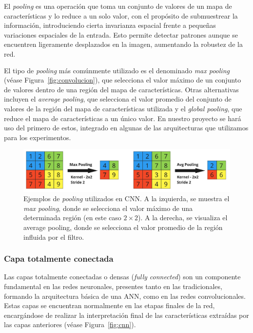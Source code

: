El \textit{pooling} es una operación que toma un conjunto de valores de un mapa de características y lo reduce a un solo valor, con el propósito de submuestrear la información, introduciendo cierta invarianza espacial frente a pequeñas variaciones espaciales de la entrada. Esto permite detectar patrones aunque se encuentren ligeramente desplazados en la imagen, aumentando la robustez de la red.

El tipo de \textit{pooling} más comúnmente utilizado es el denominado \emph{max pooling} (véase Figura~\ref{fig:convolucion}), que selecciona el valor máximo de un conjunto de valores dentro de una región del mapa de características. Otras alternativas incluyen el \emph{average pooling}, que selecciona el valor promedio del conjunto de valores de la región del mapa de características utilizada y el \emph{global pooling}, que reduce el mapa de características a un único valor. En nuestro proyecto se hará uso del primero de estos, integrado en algunas de las arquitecturas que utilizamos para los experimentos.

\begin{figure}[h]
    \centering
    \includegraphics[width=0.8\linewidth]{img/pooling.png}
    \caption[Ejemplos de \textit{pooling} utilizados en CNN.]{Ejemplos de \textit{pooling} utilizados en CNN. A la izquierda, se muestra el \textit{max pooling}, donde se selecciona el valor máximo de una determinada región (en este caso $2 \times 2$). A la derecha, se visualiza el average pooling, donde se selecciona el valor promedio de la región influida por el filtro.}\label{fig:pooling}
\end{figure}

\subsubsection{Capa totalmente conectada}

Las capas totalmente conectadas o densas (\emph{fully connected}) son un componente fundamental en las redes neuronales, presentes tanto en las tradicionales, formando la arquitectura básica de una ANN, como en las redes convolucionales. Estas capas se encuentran normalmente en las etapas finales de la red, encargándose de realizar la interpretación final de las características extraídas por las capas anteriores (véase Figura~\ref{fig:cnn}).

